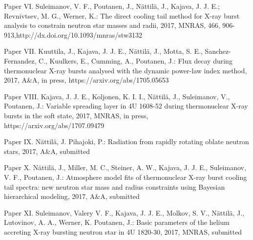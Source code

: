 Paper VI. Suleimanov, V. F., Poutanen, J., Nättilä, J., Kajava, J. J. E.; Revnivtsev, M. G., Werner, K.: The direct cooling tail method for X-ray burst analysis to constrain neutron star masses and radii, 2017, MNRAS, 466, 906-913,http://dx.doi.org/10.1093/mnras/stw3132

Paper VII. Kuuttila, J., Kajava, J. J. E., Nättilä, J., Motta, S. E., Sanchez-Fernandez, C., Kuulkers, E., Cumming, A., Poutanen, J.: Flux decay during thermonuclear X-ray bursts analysed with the dynamic power-law index method, 2017, A&A, in press, https://arxiv.org/abs/1705.05653

Paper VIII. Kajava, J. J. E., Koljonen, K. I. I., Nättilä, J., Suleimanov, V., Poutanen, J.: Variable spreading layer in 4U 1608-52 during thermonuclear X-ray bursts in the soft state, 2017, MNRAS, in press, https://arxiv.org/abs/1707.09479

Paper IX. Nättilä, J. Pihajoki, P.: Radiation from rapidly rotating oblate neutron stars, 2017, A&A, submitted

Paper X. Nättilä, J., Miller, M. C., Steiner, A. W., Kajava, J. J. E., Suleimanov, V. F., Poutanen, J.: Atmosphere model fits of thermonuclear X-ray burst cooling tail spectra: new neutron star mass and radius constraints using Bayesian hierarchical modeling, 2017, A&A, submitted

Paper XI. Suleimanov, Valery V. F., Kajava, J. J. E., Molkov, S. V., Nättilä, J., Lutovinov, A. A., Werner, K. Poutanen, J.: Basic parameters of the helium accreting X-ray bursting neutron star in 4U 1820-30, 2017, MNRAS, submitted

